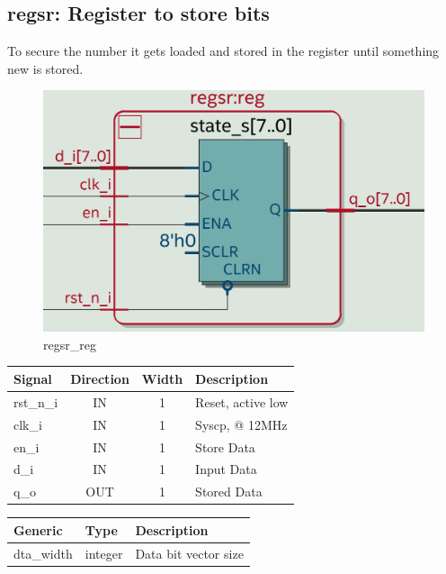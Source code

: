 \documentclass[12pt,a4 paper] {report}
\begin{document}
\newpage

\subsection{regsr: Register to store bits}
To secure the number it gets loaded and stored in the register until something new is stored.
\begin{figure}[h]
	\centering	
	\includegraphics[scale=0.15]{../png/regsr_reg.png}
	\caption{regsr\_reg}
\end{figure}
\begin{center}
	\begin{tabular}{ | p{2cm} | c | c | p{5cm} |}
		\hline
		\textbf{Signal} & \textbf{Direction} & \textbf{Width} & \textbf{Description} \\
		\hline	
 		rst\_n\_i & IN & 1 & Reset, active low \\
 		\hline
		clk\_i & IN & 1 & Syscp, @ 12MHz \\
		\hline
		en\_i & IN & 1 & Store Data \\
		\hline
		d\_i & IN & 1 & Input Data \\
		\hline
		q\_o & OUT & 1 & Stored Data \\
		\hline
	\end{tabular}
\end{center}
\begin{center}
	\begin{tabular}{| p{2cm} | p{2cm} | p{4cm} |}
	\hline
	\textbf{Generic} & \textbf{Type} & \textbf{Description} \\
	\hline
	dta\_width & integer & Data bit vector size \\
	\hline
	\end{tabular}
\end{center}
\end{document}
